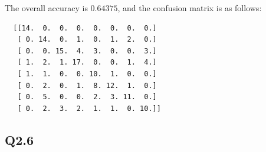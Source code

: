 \documentclass[11pt]{article}
\begin{document}
The overall accuracy is $0.64375$, and the confusion matrix is as follows:

\begin{verbatim}
  [[14.  0.  0.  0.  0.  0.  0.  0.]
   [ 0. 14.  0.  1.  0.  1.  2.  0.]
   [ 0.  0. 15.  4.  3.  0.  0.  3.]
   [ 1.  2.  1. 17.  0.  0.  1.  4.]
   [ 1.  1.  0.  0. 10.  1.  0.  0.]
   [ 0.  2.  0.  1.  8. 12.  1.  0.]
   [ 0.  5.  0.  0.  2.  3. 11.  0.]
   [ 0.  2.  3.  2.  1.  1.  0. 10.]]
\end{verbatim}

\newpage

\subsection*{Q2.6}

\end{document}
